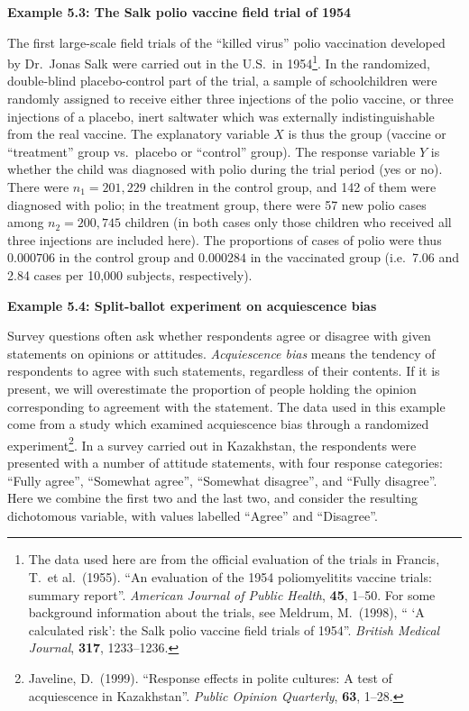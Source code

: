 \textbf{Example 5.3:
The Salk polio vaccine field trial of 1954}

The first large-scale field trials of the ``killed virus'' polio
vaccination developed by Dr.\ Jonas Salk were carried out in the U.S.\
in 1954\footnote{The data used here are from the official evaluation of
the trials in Francis, T.\ et al.\ (1955). ``An evaluation of the 1954
poliomyelitits vaccine trials: summary report''. \emph{American Journal
of Public Health}, \textbf{45}, 1--50. For some background information
about the trials, see Meldrum, M.\ (1998), `` `A calculated risk': the
Salk polio vaccine field trials of 1954''. \emph{British Medical
Journal}, \textbf{317}, 1233--1236.}. In the randomized, double-blind
placebo-control part of the trial, a sample of schoolchildren were
randomly assigned to receive either three injections of the polio
vaccine, or three injections of a placebo, inert saltwater which was
externally indistinguishable from the real vaccine. The explanatory
variable $X$ is thus the group (vaccine or ``treatment'' group vs.\
placebo or ``control'' group). The response  variable $Y$ is whether the
child was diagnosed with polio during the trial period (yes or no).
There were $n_{1}=201,229$ children in the control group, and 142 of
them were diagnosed with polio; in the treatment group, there were 57
new polio cases among $n_{2}=200,745$ children (in both cases only those
children who received all three injections are included here). The
proportions of cases of polio were thus
$0.000706$ in the control group
and $0.000284$ in the vaccinated group (i.e.\
7.06 and 2.84 cases per 10,000
subjects, respectively).

\textbf{Example 5.4:
Split-ballot experiment on acquiescence bias}

Survey questions often ask whether respondents agree or disagree with
given statements on opinions or attitudes.
\emph{Acquiescence bias} means the tendency of respondents to agree
with such statements, regardless of their contents. If it is present, we
will overestimate the proportion of people holding the opinion
corresponding to agreement with the statement. The data used in this
example come from a study which examined acquiescence bias through a
randomized experiment\footnote{Javeline, D.\ (1999). ``Response effects
in polite cultures: A test of acquiescence in Kazakhstan''. \emph{Public
Opinion Quarterly}, \textbf{63}, 1--28.}. In a survey carried out in Kazakhstan, the respondents were
presented with a number of attitude statements, with four response
categories: ``Fully agree'', ``Somewhat agree'', ``Somewhat disagree'',
and ``Fully disagree''. Here we combine the first two and the last two,
and consider the resulting dichotomous variable, with values labelled
``Agree'' and ``Disagree''.

